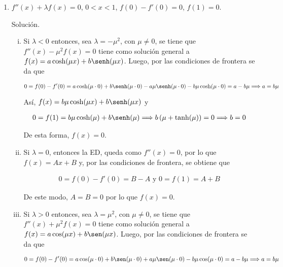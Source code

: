 \documentclass[fleqn]{article}
\begin{document}
\begin{enumerate}[I.]
\begin{enumerate}
			\bfseries
			
			\item $ f''(x) + \lambda f(x) = 0 $, $ 0 < x < 1 $, $ f(0) - f'(0) = 0 $, $ f(1) = 0 $.
			
			Solución.
			
			\normalfont

			\begin{enumerate}[i)]
				\item Si $ \lambda < 0 $ entonces, sea $ \lambda = - \mu^2 $, con $ \mu \neq 0 $, se tiene que $ f''(x) - \mu^2 f(x) = 0 $
				tiene como solución general a $ f(x) = a \cosh(\mu x) + b \senh(\mu x) $. Luego, por las condiciones de frontera se da que
				
				\begin{equation*}
					0 = f(0) - f'(0) = a \cosh(\mu \cdot 0) + b \senh(\mu \cdot 0) - a \mu \senh(\mu \cdot 0) - b \mu \cosh(\mu \cdot 0) = a - b \mu \Longrightarrow a = b \mu
				\end{equation*}

				Así, $ f(x) = b \mu \cosh(\mu x) + b \senh(\mu x) $ y 

				\begin{align*}
					0 = f(1) = b \mu \cosh(\mu) + b \senh(\mu) \Longrightarrow b \left( \mu + \tanh(\mu) \right) = 0 \Longrightarrow b = 0
				\end{align*}
				
				De esta forma, $ f(x) = 0 $.

				\item Si $ \lambda = 0 $, entonces la ED, queda como $ f''(x) = 0 $, por lo que $ f(x) = Ax + B $ y, por las condiciones de frontera, se obtiene que 
				
				\begin{align*}
					0 = f(0) - f'(0) = B - A \mbox{ y } 0 = f(1) = A + B
				\end{align*}

				De este modo, $ A = B = 0 $ por lo que $ f(x) = 0 $.
				
				\item Si $ \lambda > 0 $ entonces, sea $ \lambda = \mu^2 $, con $ \mu \neq 0 $, se tiene que $ f''(x) + \mu^2 f(x) = 0 $
				tiene como solución general a $ f(x) = a \cos(\mu x) + b \sen(\mu x) $. Luego, por las condiciones de frontera se da que
				
				\begin{equation*}
					0 = f(0) - f'(0) = a \cos(\mu \cdot 0) + b \sen(\mu \cdot 0) + a \mu \sen (\mu \cdot 0) - b \mu \cos (\mu \cdot 0) = a - b \mu \Longrightarrow a = b \mu
				\end{equation*}


\end{enumerate}
\end{enumerate}
\end{enumerate}
\end{document}
